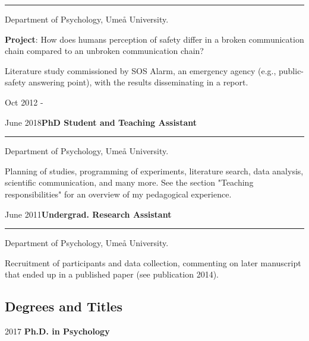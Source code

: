 \documentclass[]{article}
\begin{document}
\hrule
\begin{changemargin}{2.3cm}{2.4cm}

Department of Psychology, Umeå University.

\textbf{Project}: How does humans perception of safety differ in a broken communication chain compared to an unbroken communication chain? 

Literature study commissioned by SOS Alarm, an emergency agency (e.g., public-safety answering point), with the results disseminating in a report.

\end{changemargin}

Oct 2012 -

June
2018\hspace{0.75cm}\textbf{PhD Student and Teaching Assistant}\vspace{1mm}

\hrule
\begin{changemargin}{2.3cm}{2.4cm}

Department of Psychology, Umeå University.

Planning of studies, programming of experiments, literature search, data analysis, scientific communication, and many more. See the section "Teaching responsibilities" for an overview of my pedagogical experience.

\end{changemargin}

June
2011\hspace{0.75cm}\textbf{Undergrad. Research Assistant}\vspace{1mm}

\hrule
\begin{changemargin}{2.3cm}{2.4cm}

Department of Psychology, Umeå University.

Recruitment of participants and data collection, commenting on later manuscript that ended up in a published paper (see publication 2014). 

\end{changemargin}

\newpage

\subsection{Degrees and Titles}\label{degrees-and-titles}

2017 \hspace{1.5cm} \textbf{Ph.D. in Psychology}\vspace{1mm}
\end{document}
